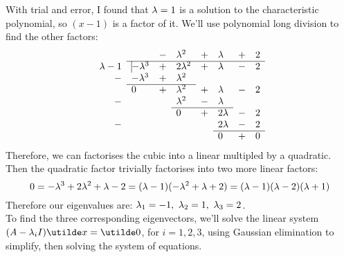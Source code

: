 \documentclass[a4paper,12pt]{report}
\begin{document}
With trial and error, I found that $\lambda=1$ is a solution to the characteristic polynomial, so $(x-1)$ is a factor of it. We'll use polynomial long division to find the other factors:
$$
  \begin{array}{rlclclcl}
          & & - & \lm^2 & + & \lm & + & 2 \\ \cline{2-8}
    \lm-1 &\vline -\lm^3 & + & 2\lm^2 & + & \lm & - & 2 \\
        - & -\lm^3 & + & \lm^2 \\ \cline{2-4} 
          & 0 & + & \lm^2 & + & \lm & - & 2 \\
        - &   &   & \lm^2 & - & \lm \\ \cline{4-6}
          &   &   & 0     & + & 2\lm & - & 2 \\
        - &   &   &       &   & 2\lm & - & 2 \\ \cline{6-8}
          &   &   &       &   & 0    & + & 0 \\
  \end{array}
$$
Therefore, we can factorises the cubic into a linear multipled by a quadratic. Then the quadratic factor trivially factorises into two more linear factors:
$$
  0 = -\lambda^3 + 2\lambda^2 + \lambda - 2 = (\lambda-1)(-\lambda^2 + \lambda + 2) = (\lambda-1)(\lambda-2)(\lambda+1)
$$
Therefore our eigenvalues are: $\lambda_1=-1,\ \lambda_2=1,\ \lambda_3=2$.\\
To find the three corresponding eigenvectors, we'll solve the linear system $(A - \lm_iI)\ut{x} = \ut{0}$, for $i=1,2,3$, using Gaussian elimination to simplify, then solving the system of equations. \\
\end{document}
